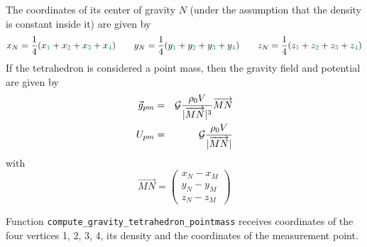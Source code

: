 \begin{center}
\end{center}


The coordinates of its center of gravity $N$ (under the assumption that the 
density is constant inside it) are given by 
\begin{equation}
x_N= \frac{1}{4}(x_{\color{teal}1}+x_{\color{teal}2}+x_{\color{teal}3}+x_{\color{teal}4})
\qquad
y_N= \frac{1}{4}(y_{\color{teal}1}+y_{\color{teal}2}+y_{\color{teal}3}+y_{\color{teal}4})
\qquad
z_N= \frac{1}{4}(z_{\color{teal}1}+z_{\color{teal}2}+z_{\color{teal}3}+z_{\color{teal}4})
\label{eq:tet:centerN}
\end{equation}
If the tetrahedron is considered a point mass, then 
the gravity field and potential are given by
\begin{eqnarray}
\vec{g}_{pm} &=& {\cal G}  \frac{\rho_0 V}{|\overrightarrow{MN}|^3} \overrightarrow{MN}
\\
U_{pm} &=& {\cal G}  \frac{\rho_0 V}{|\overrightarrow{MN}|} 
\end{eqnarray}
with 
\[
\overrightarrow{MN} =
\left(
\begin{array}{c}
x_N - x_M \\
y_N - y_M \\
z_N - z_M 
\end{array}
\right)
\]

Function \verb|compute_gravity_tetrahedron_pointmass| receives coordinates of the four 
vertices {\color{teal}1}, {\color{teal}2}, {\color{teal}3}, {\color{teal}4},  its 
density and the coordinates of the measurement point.

